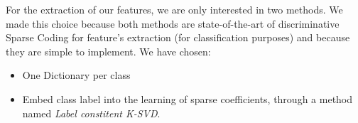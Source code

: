 For the extraction of our features, we are only interested in two methods. We made this choice because both methods are state-of-the-art of discriminative Sparse Coding for feature's extraction (for classification purposes) and because they are simple to implement. We have chosen:
\begin{itemize}
 \item One Dictionary per class
 \item Embed class label into the learning of sparse coefficients, through a method named \textit{Label constitent K-SVD}.
\end{itemize}


